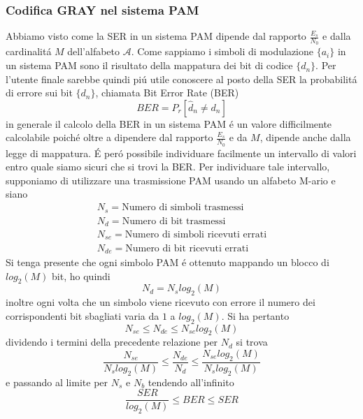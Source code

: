         \subsubsection{Codifica GRAY nel sistema PAM}
            Abbiamo visto come la SER in un sistema PAM dipende dal rapporto $\frac{E_s}{N_0}$ e dalla cardinalitá 
            $M$ dell'alfabeto $\mathcal{A}$. Come sappiamo i simboli di modulazione $\{a_i\}$ in un sistema PAM sono
            il risultato della mappatura dei bit di codice $\{d_n\}$. Per l'utente finale sarebbe quindi piú utile 
            conoscere al posto della SER la probabilitá di errore sui bit $\{d_n\}$, chiamata Bit Error Rate (BER)
            \[
                BER = P_r[\hat{d}_n \neq d_n]    
            \] 
            in generale il calcolo della BER in un sistema PAM é un valore difficilmente calcolabile poiché oltre a dipendere
            dal rapporto $\frac{E_s}{N_0}$ e da $M$, dipende anche dalla legge di mappatura. É peró possibile 
            individuare facilmente un intervallo di valori entro quale siamo sicuri che si trovi la BER.
            Per individuare tale intervallo, supponiamo di utilizzare una trasmissione PAM usando un alfabeto
            M-ario e siano
            \begin{gather}
                N_s = \text{Numero di simboli trasmessi}\nonumber \\
                N_d = \text{Numero di bit trasmessi}\nonumber \\
                N_{se} = \text{Numero di simboli ricevuti errati}\nonumber \\
                N_{de} = \text{Numero di bit ricevuti errati}\nonumber 
            \end{gather}
            Si tenga presente che ogni simbolo PAM é ottenuto mappando un blocco di $log_2(M)$ bit, ho quindi
            \[
                N_d = N_slog_2(M)    
            \]
            inoltre ogni volta che un simbolo viene ricevuto con errore il numero dei corrispondenti bit sbagliati 
            varia da $1$ a $log_2(M)$. Si ha pertanto 
            \[
                N_{se} \leq N_{de} \leq N_{se} log_2(M)    
            \]
            dividendo i termini della precedente relazione per $N_d$ si trova
            \[
                \frac{N_{se}}{N_slog_2(M)} \leq \frac{N_{de}}{N_{d}} \leq \frac{N_{se} log_2(M)}{N_{s} log_2(M)}    
            \]
            e passando al limite per $N_s$ e $N_b$ tendendo all'infinito 
            \[
                \frac{SER}{log_2(M)} \leq BER \leq SER    
            \]
